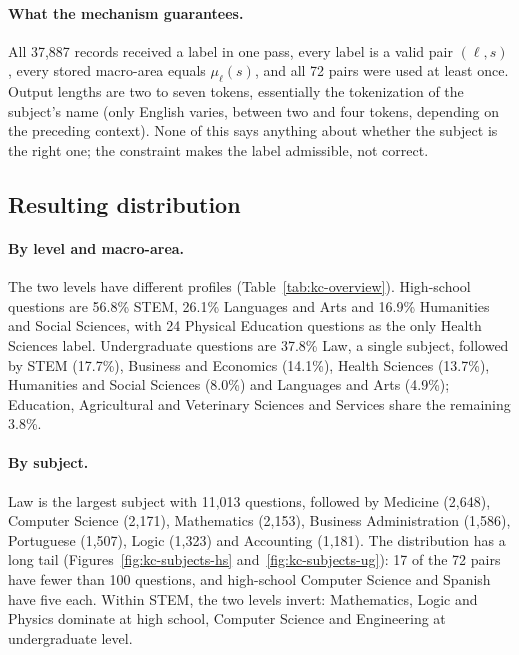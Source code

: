 \paragraph{What the mechanism guarantees.} All 37,887 records received a
label in one pass, every label is a valid pair $(\ell,s)$, every stored
macro-area equals $\mu_\ell(s)$, and all 72 pairs were used at least once.
Output lengths are two to seven tokens, essentially the tokenization of the
subject's name (only English varies, between two and four tokens, depending
on the preceding context). None of this says anything about whether the
subject is the right one; the constraint makes the label admissible, not
correct.

\subsection{Resulting distribution}
\label{app:kc-distribution}

\paragraph{By level and macro-area.} The two levels have different
profiles (Table~\ref{tab:kc-overview}). High-school questions are 56.8\%
STEM, 26.1\% Languages and Arts and 16.9\% Humanities and Social Sciences,
with 24 Physical Education questions as the only Health Sciences label.
Undergraduate questions are 37.8\% Law, a single subject, followed by STEM
(17.7\%), Business and Economics (14.1\%), Health Sciences (13.7\%),
Humanities and Social Sciences (8.0\%) and Languages and Arts (4.9\%);
Education, Agricultural and Veterinary Sciences and Services share the
remaining 3.8\%.

\paragraph{By subject.} Law is the largest subject with 11,013 questions,
followed by Medicine (2,648), Computer Science (2,171), Mathematics (2,153),
Business Administration (1,586), Portuguese (1,507), Logic (1,323) and
Accounting (1,181). The distribution has a long tail
(Figures~\ref{fig:kc-subjects-hs} and~\ref{fig:kc-subjects-ug}): 17 of the
72 pairs have fewer than 100
questions, and high-school Computer Science and Spanish have five each.
Within STEM, the two levels invert: Mathematics, Logic and Physics dominate
at high school, Computer Science and Engineering at undergraduate level.


